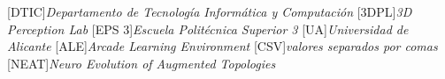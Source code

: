 [DTIC]{\emph{Departamento de Tecnología Informática y Computación}}
[3DPL]{\emph{3D Perception Lab}}
[EPS 3]{\emph{Escuela Politécnica Superior 3}}
[UA]{\emph{Universidad de Alicante}}
[ALE]{\emph{Arcade Learning Environment}}
[CSV]{\emph{valores separados por comas}}
[NEAT]{\emph{Neuro Evolution of Augmented Topologies}}

